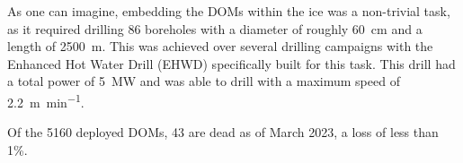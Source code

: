 \documentclass[
    a4paper, %
    fontsize=10pt, %
    twoside=true, %
    numbers=noenddot, %
    fontmethod=tex, %
]{kaobook}
\begin{document}
As one can imagine, embedding the DOMs within the ice was a non-trivial task, as it required drilling 86 boreholes with a diameter of roughly \SI{60}{\cm} and a length of \SI{2500}{\m}. This was achieved over several drilling campaigns with the Enhanced Hot Water Drill (EHWD) specifically built for this task. This drill had a total power of \SI{5}{\mega\W} and was able to drill with a maximum speed of \SI{2.2}{\meter\per\minute}.

Of the 5160 deployed DOMs, 43 are dead as of March 2023, a loss of less than 1\%.





\appendix




\backmatter %


\printbibliography[heading=bibintoc, title=Bibliography] %



\printindex %
\end{document}

